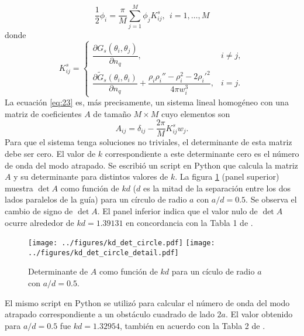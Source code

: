 \documentclass[11pt]{article}
\begin{document}
\begin{equation}
  \label{eq:23}
  \frac{1}{2} \phi_i = \frac{\pi}{M}\sum_{j=1}^M \phi_j K_{ij}^s,~~i=1,\ldots,M
\end{equation}
donde
\begin{equation}
  \label{eq:24}
  K^s_{ij} =
\begin{cases}
\dfrac{\partial G_s(\theta_i,\theta_j)}{\partial n_q}, 
& i \ne j, \\[1em]
\dfrac{\partial \tilde{G}_s(\theta_i,\theta_i)}{\partial n_q} 
+ \dfrac{\rho_i \rho_i'' - \rho_i^2 - 2\rho_i'^2}{4\pi w_i^3}, 
& i = j .
\end{cases}
\end{equation}
La ecuación \eqref{eq:23} es, más precisamente, un sistema lineal homogéneo con una matriz de coeficientes $A$ de tamaño $M \times M$ cuyo elementos son
\begin{equation}
  \label{eq:25}
A_{ij} =  \delta_{ij} - \frac{2\pi}{M}K^s_{ij} w_j.
\end{equation}
Para que el sistema tenga soluciones no triviales, el determinante de esta matriz debe ser cero. El valor de $k$ correspondiente a este determinante cero es el número de onda del modo atrapado. Se escribió un script en Python que calcula la matriz $A$ y su determinante para distintos valores de $k$. La figura \ref{fig:kd_det_circle} (panel superior) muestra $\det A$ como función de $kd$ ($d$ es la mitad de la separación entre los dos lados paralelos de la guía) para un círculo de radio $a$ con $a/d=0.5$. Se observa el cambio de signo de $\det A$. El panel inferior indica que el valor nulo de $\det A$ ocurre alrededor de $kd = 1.39131$ en concordancia con la Tabla 1 de \cite{linton1992integral}.
\begin{figure}[h]
  \centering
  \texttt{[image: ../figures/kd\_det\_circle.pdf]}
  \texttt{[image: ../figures/kd\_det\_circle\_detail.pdf]}  
  \caption{\label{fig:kd_det_circle} Determinante de $A$ como función de $kd$ para un cículo de radio $a$ con $a/d=0.5$.}
\end{figure}

El mismo script en Python se utilizó para calcular el número de onda del modo atrapado correspondiente a un obstáculo cuadrado de lado $2a$. El valor obtenido para $a/d=0.5$ fue $kd=1.32954$, también en acuerdo con la Tabla 2 de \cite{linton1992integral}.
\end{document}
